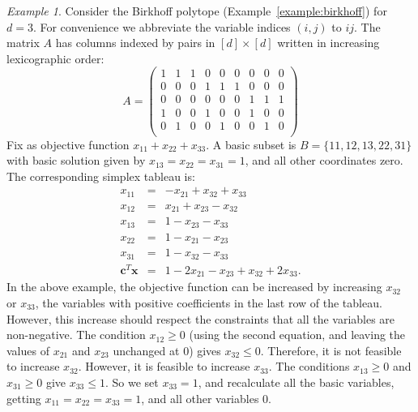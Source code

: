 \documentclass{amsbook}
\newcommand{\xx}{\mathbf x}
\newcommand{\cc}{\mathbf c}
\theoremstyle{definition}
\theoremstyle{remark}
\newtheorem{example}[theorem]{Example}
\begin{document}
\begin{example}
  \label{example:birkhoff3-tableau}
  Consider the Birkhoff polytope (Example~\ref{example:birkhoff}) for $d=3$.
  For convenience we abbreviate the variable indices $(i,j)$ to $ij$.
  The matrix $A$ has columns indexed by pairs in $[d]\times [d]$ written in increasing lexicographic order:
  \begin{displaymath}
    A =
    \begin{pmatrix}
      1 & 1 & 1 & 0 & 0 & 0 & 0 & 0 & 0\\
      0 & 0 & 0 & 1 & 1 & 1 & 0 & 0 & 0\\
      0 & 0 & 0 & 0 & 0 & 0 & 1 & 1 & 1\\
      1 & 0 & 0 & 1 & 0 & 0 & 1 & 0 & 0\\
      0 & 1 & 0 & 0 & 1 & 0 & 0 & 1 & 0\\
    \end{pmatrix}
  \end{displaymath}
  Fix as objective function $x_{11}+x_{22}+x_{33}$.
  A basic subset is $B=\{11,12,13,22,31\}$ with basic solution given by $x_{13}=x_{22}=x_{31}=1$, and all other coordinates zero.
  The corresponding simplex tableau is:
  \begin{displaymath}
    \begin{matrix}
      x_{11} & = & -x_{21} +x_{32}+x_{33}\\
      x_{12} & = & x_{21}+x_{23}-x_{32}\\
      x_{13} & = & 1-x_{23}-x_{33}\\
      x_{22} & = & 1-x_{21} -x_{23}\\
      x_{31} & = & 1-x_{32}-x_{33}\\
      \hline
      \cc^T\xx & = & 1-2x_{21}-x_{23}+x_{32}+2x_{33}.
    \end{matrix}
  \end{displaymath}
  In the above example, the objective function can be increased by increasing $x_{32}$ or $x_{33}$, the variables with positive coefficients in the last row of the tableau.
  However, this increase should respect the constraints that all the variables are non-negative.
  The condition $x_{12}\geq 0$ (using the second equation, and leaving the values of $x_{21}$ and $x_{23}$ unchanged at $0$) gives $x_{32}\leq 0$.
  Therefore, it is not feasible to increase $x_{32}$.
  However, it is feasible to increase $x_{33}$.
  The conditions $x_{13}\geq 0$ and $x_{31}\geq 0$ give $x_{33}\leq 1$.
  So we set $x_{33}=1$, and recalculate all the basic variables, getting $x_{11}=x_{22}=x_{33}=1$, and all other variables $0$.

\end{example}
\end{document}
